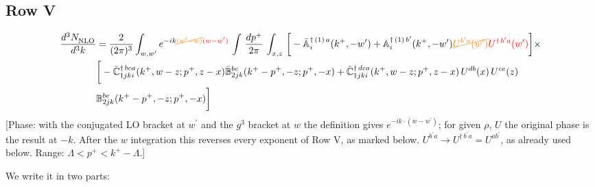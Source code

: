 \documentclass[9pt]{article}
\def\mf#1{\mathbb{#1}}
\numberwithin{equation}{section}
\begin{document}
\subsection{Row V\,}
\begin{align}
    \frac{d^{3}N_{\rm NLO}^{\rm}}{d^{3}k}  & = \frac{2}{(2\pi)^{3}}  \int_{w, w^\prime} e^{-ik{\color{orange}\cancel{(w^\prime-w)}}{\color{red}(w-w^\prime)}}\, \int\, \frac{dp^{+}}{2\pi}\,\int_{x,z}\, \bigg[-\bar{\mf{A}}^{\dagger\,(1)\,a}_{i}(k^{+},-w^{\prime})+\mf{A}^{\dagger\, (1)\, b^{\prime}}_{i}(k^{+},-w^{\prime}){\color{orange}\cancel{U^{b^{\prime}a}(w^{\prime})}}{\color{red}U^{\dagger\, b^{\prime}a}(w^{\prime})}\bigg]\times\notag \\ & \bigg[-\Bar{\mf{C}}^{\dagger\, bca}_{1jki}(k^{+},w-z;p^{+},z-x)\Bar{\mf{B}}^{bc}_{2jk}(k^{+}-p^{+},- z;p^{+},-x)+\bar{\mf{C}}^{\dagger\, dca}_{1jki}(k^+,w-z; p^+, z-x)\,U^{db}(x)\,U^{ce}(z) \notag \\ & {\mf{B}}^{be}_{2jk} (k^{+}-p^+, -z; p^+, -x) \bigg]\nonumber
\end{align} {\color{red}[Phase: with the conjugated LO bracket at $w^\prime$ and the $g^{3}$ bracket at $w$ the definition gives $e^{-ik\cdot(w-w^\prime)}$; for given $\rho$, $U$ the original phase is the result at $-k$. After the $w$ integration this reverses every exponent of Row V, as marked below. $U^{b^\prime a}\to U^{\dagger\, b^\prime a}=U^{ab^\prime}$, as already used below. Range: $\Lambda<p^{+}<k^{+}-\Lambda$.]}\par\noindent 
We write it in two parts:
\end{document}
